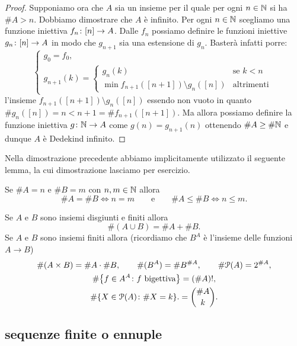 \begin{proof}
Supponiamo ora che $A$ sia un insieme per il quale per ogni $n\in {\mathbb N}$ 
si ha $\#A > n$. Dobbiamo dimostrare che $A$ è infinito.
Per ogni $n\in {\mathbb N}$ scegliamo
una funzione iniettiva $f_n\colon{\left[ n \right]}\to A$.
%
Dalle $f_n$ possiamo definire le funzioni iniettive $g_n\colon {\left[ n \right]}\to A$
in modo che $g_{n+1}$ sia una estensione di $g_n$.
Basterà infatti porre:
\[
  \begin{cases}
  g_0 = f_0,\\
  g_{n+1}(k) = \begin{cases}
    g_n(k) &\text{se $k<n$}\\
    \min f_{n+1}([n+1])\setminus g_n([n]) & \text{altrimenti}
    \end{cases}
  \end{cases}
\]
l'insieme $f_{n+1}([n+1])\setminus g_n([n])$ essendo non vuoto 
in quanto $\# g_n([n]) = n < n+1 = \# f_{n+1}([n+1])$.
Ma allora possiamo definire la funzione iniettiva $g\colon {\mathbb N} \to A$
come $g(n) = g_{n+1}(n)$ ottenendo $\#A \ge \#{\mathbb N}$ e dunque $A$ 
è Dedekind infinito.
\end{proof}

Nella dimostrazione precedente abbiamo implicitamente utilizzato il seguente lemma,
la cui dimostrazione lasciamo per esercizio.
\begin{lemma}
  Se $\#A = n$ e $\#B = m$ con $n,m\in {\mathbb N}$ allora 
  \[
    \#A = \#B \iff n=m
    \qquad \text{e}\qquad
    \#A \le \#B \iff n \le m.
  \]
\end{lemma}


\begin{exercise}
  \label{th:combinatoria}
  Se $A$ e $B$ sono insiemi disgiunti e finiti allora  
  \[
    \#(A\cup B) = \#A + \#B.
  \]
  Se $A$ e $B$ sono insiemi finiti allora 
  (ricordiamo che $B^A$ è l'insieme delle funzioni $A\to B$)
  \begin{gather*}
    \#(A \times B) = \#A\cdot \#B, \qquad
    \#(B^A) = \#B^{\#A}, \qquad
    \#\mathcal P(A) = 2^{\# A}, \\
    \#{\left\{ f\in A^A\colon \text{$f$ bigettiva} \right\}} = (\#A)!, \\
     \#{\left\{ X\in \mathcal P(A)\colon \#X = k \right\}}.  
     = {\#A \choose k}. 
  \end{gather*}
\end{exercise}

\subsection{sequenze finite o ennuple}

